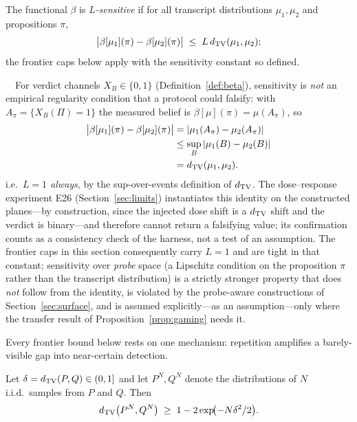\begin{definition}[Sensitivity]\label{def:sens}
The functional $\beta$ is \emph{$L$-sensitive} if for all transcript
distributions $\mu_1,\mu_2$ and propositions $\pi$,
\[
\bigl|\beta[\mu_1](\pi)-\beta[\mu_2](\pi)\bigr|
\;\le\;L\,d_{\mathrm{TV}}(\mu_1,\mu_2);
\]
the frontier caps below apply with the sensitivity constant so defined.
\end{definition}

\begin{remark}\label{rem:sens}\ \
For verdict channels $X_B\in\{0,1\}$ (Definition~\ref{def:beta}), sensitivity
is \emph{not} an empirical regularity condition that a protocol could
falsify: with $A_\pi=\{X_B(\Pi)=1\}$ the measured belief is
$\beta[\mu](\pi)=\mu(A_\pi)$, so
\[
\begin{aligned}
\bigl|\beta[\mu_1](\pi)-\beta[\mu_2](\pi)\bigr|
&=|\mu_1(A_\pi)-\mu_2(A_\pi)|\\
&\le\sup_B|\mu_1(B)-\mu_2(B)|\\
&=d_{\mathrm{TV}}(\mu_1,\mu_2).
\end{aligned}
\]
i.e.\ \emph{$L=1$ always}, by the sup-over-events definition of $d_{\mathrm{TV}}$.
The dose--response experiment E26 (Section~\ref{sec:limits}) instantiates
this identity on the constructed planes---by construction, since the
injected dose shift is a $d_{\mathrm{TV}}$ shift and the verdict is binary---and
therefore cannot return a falsifying value; its confirmation counts as a
consistency check of the harness, not a test of an assumption. The frontier
caps in this section consequently carry $L=1$ and are tight in that
constant; sensitivity over \emph{probe} space (a Lipschitz condition on the
proposition $\pi$ rather than the transcript distribution) is a strictly
stronger property that does \emph{not} follow from the identity, is
violated by the probe-aware constructions of
Section~\ref{sec:surface}, and is assumed explicitly---as an
assumption---only where the transfer result of
Proposition~\ref{prop:gaming} needs it.
\end{remark}

Every frontier bound below rests on one mechanism: repetition amplifies a
barely-visible gap into near-certain detection.

\begin{lemma}[Amplification]\label{lem:amp}
Let $\delta=d_{\mathrm{TV}}(P,Q)\in(0,1]$ and let $P^N,Q^N$ denote the distributions of
$N$ i.i.d.\ samples from $P$ and $Q$. Then
\[
d_{\mathrm{TV}}\bigl(P^{N},Q^{N}\bigr)\;\ge\;1-2\exp\!\bigl(-N\delta^{2}/2\bigr).
\]
\end{lemma}

